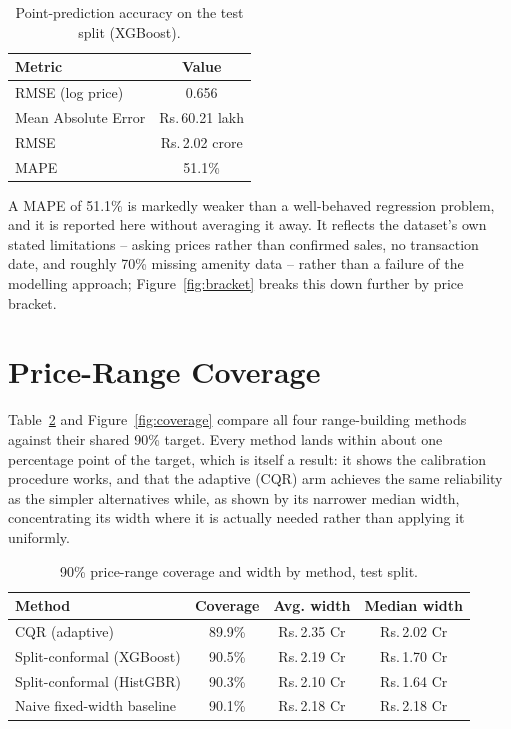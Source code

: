 \documentclass[12pt]{report}
\begin{document}
\begin{table}[h]
\centering
\caption{Point-prediction accuracy on the test split (XGBoost).}
\label{tab:point}
\begin{tabular}{lc}
\toprule
Metric & Value \\
\midrule
RMSE (log price) & 0.656 \\
Mean Absolute Error & Rs.\,60.21 lakh \\
RMSE & Rs.\,2.02 crore \\
MAPE & 51.1\% \\
\bottomrule
\end{tabular}
\end{table}

A MAPE of 51.1\% is markedly weaker than a well-behaved regression problem, and it is
reported here without averaging it away. It reflects the dataset's own stated
limitations -- asking prices rather than confirmed sales, no transaction date, and
roughly 70\% missing amenity data -- rather than a failure of the modelling approach;
Figure~\ref{fig:bracket} breaks this down further by price bracket.

\section{Price-Range Coverage}
Table~\ref{tab:coverage} and Figure~\ref{fig:coverage} compare all four range-building
methods against their shared 90\% target. Every method lands within about one
percentage point of the target, which is itself a result: it shows the calibration
procedure works, and that the adaptive (CQR) arm achieves the same reliability as the
simpler alternatives while, as shown by its narrower median width, concentrating
its width where it is actually needed rather than applying it uniformly.

\begin{table}[h]
\centering
\caption{90\% price-range coverage and width by method, test split.}
\label{tab:coverage}
\begin{tabular}{lccc}
\toprule
Method & Coverage & Avg. width & Median width \\
\midrule
CQR (adaptive) & 89.9\% & Rs.\,2.35 Cr & Rs.\,2.02 Cr \\
Split-conformal (XGBoost) & 90.5\% & Rs.\,2.19 Cr & Rs.\,1.70 Cr \\
Split-conformal (HistGBR) & 90.3\% & Rs.\,2.10 Cr & Rs.\,1.64 Cr \\
Naive fixed-width baseline & 90.1\% & Rs.\,2.18 Cr & Rs.\,2.18 Cr \\
\bottomrule
\end{tabular}
\end{table}
\end{document}
